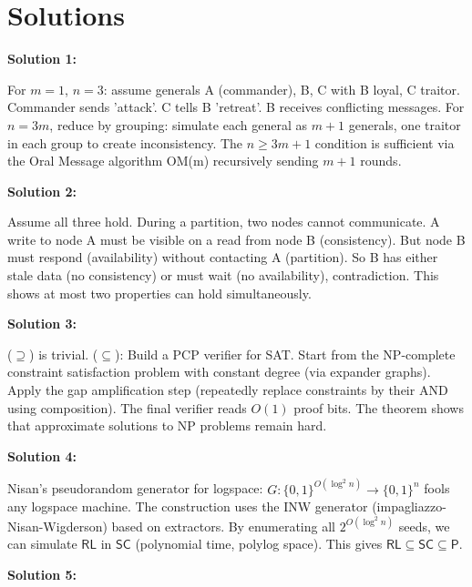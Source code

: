\documentclass[12pt,a4paper]{exam}
\begin{document}
\newpage
\section*{Solutions}

\textbf{Solution 1:}

For $m=1$, $n=3$: assume generals A (commander), B, C with B loyal, C traitor. Commander sends 'attack'. C tells B 'retreat'. B receives conflicting messages. For $n=3m$, reduce by grouping: simulate each general as $m+1$ generals, one traitor in each group to create inconsistency. The $n \geq 3m+1$ condition is sufficient via the Oral Message algorithm OM(m) recursively sending $m+1$ rounds.

\vspace{0.5cm}

\textbf{Solution 2:}

Assume all three hold. During a partition, two nodes cannot communicate. A write to node A must be visible on a read from node B (consistency). But node B must respond (availability) without contacting A (partition). So B has either stale data (no consistency) or must wait (no availability), contradiction. This shows at most two properties can hold simultaneously.

\vspace{0.5cm}

\textbf{Solution 3:}

($\supseteq$) is trivial. ($\subseteq$): Build a PCP verifier for SAT. Start from the NP-complete constraint satisfaction problem with constant degree (via expander graphs). Apply the gap amplification step (repeatedly replace constraints by their AND using composition). The final verifier reads $O(1)$ proof bits. The theorem shows that approximate solutions to NP problems remain hard.

\vspace{0.5cm}

\textbf{Solution 4:}

Nisan's pseudorandom generator for logspace: $G: \{0,1\}^{O(\log^2 n)} \to \{0,1\}^{n}$ fools any logspace machine. The construction uses the INW generator (impagliazzo-Nisan-Wigderson) based on extractors. By enumerating all $2^{O(\log^2 n)}$ seeds, we can simulate $\mathsf{RL}$ in $\mathsf{SC}$ (polynomial time, polylog space). This gives $\mathsf{RL} \subseteq \mathsf{SC} \subseteq \mathsf{P}$.

\vspace{0.5cm}

\textbf{Solution 5:}
\end{document}
